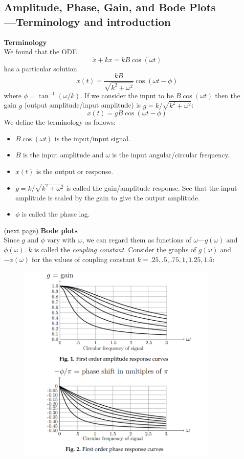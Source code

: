 \documentclass{report}
\begin{document}
\subsection{Amplitude, Phase, Gain, and Bode Plots\\---Terminology and introduction}
\textbf{Terminology}\\
We found that the ODE
\begin{equation*}
\dot{x}+kx=kB\cos(\omega t)
\end{equation*}
has a particular solution
\begin{equation*}
x(t)=\frac{kB}{\sqrt{k^2+\omega^2}}\cos(\omega t-\phi)
\end{equation*}
where $\phi=\tan^{-1}(\omega/k)$. If we consider the input to be $B\cos(\omega t)$ then the 
gain $g$ (output amplitude/input amplitude) is $g=k/\sqrt{k^2+\omega^2}$:
\begin{equation*}
x(t)=gB\cos(\omega t-\phi)
\end{equation*}
We define the terminology as follows:
\begin{itemize}
\item $B\cos(\omega t)$ is the input/input signal.
\item $B$ is the input amplitude and $\omega$ is the input angular/circular frequency.
\item $x(t)$ is the output or response.
\item $g=k/\sqrt{k^2+\omega^2}$ is called the gain/amplitude response. 
See that the input amplitude is scaled by the gain to give the output amplitude.
\item $\phi$ is called the phase lag.
\end{itemize}
(next page)
\newpage
\noindent\textbf{Bode plots}\\
Since $g$ and $\phi$ vary with 
$\omega$, we can regard them as functions of $\omega$---$g(\omega)$ and $\phi(\omega)$.
$k$ is called the \textit{coupling constant}. Consider the graphs of $g(\omega)$ and $-\phi(\omega)$ for 
the values of coupling constant $k=.25,.5,.75,1,1.25,1.5$:
\begin{figure}[h]
\begin{center}
\includegraphics[width=10cm]{12}\\
\end{center}
\end{figure}\\
\end{document}
